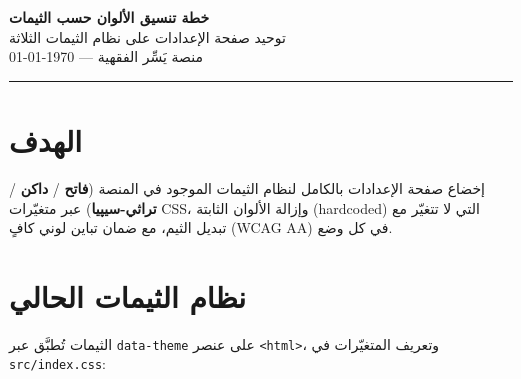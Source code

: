 \documentclass[11pt]{article}
\begin{document}
\begin{center}
  {\Huge\bfseries\color{gold} خطة تنسيق الألوان حسب الثيمات}\\[4pt]
  {\large\color{darkbg} توحيد صفحة الإعدادات على نظام الثيمات الثلاثة}\\[6pt]
  {\small\color{midgray} منصة يَسِّر الفقهية — \today}
\end{center}

\vspace{4pt}
\hrule
\vspace{10pt}

\section{الهدف}

\begin{goalbox}
إخضاع صفحة الإعدادات بالكامل لنظام الثيمات الموجود في المنصة
(\textbf{فاتح} / \textbf{داكن} / \textbf{تراثي-سيپيا}) عبر متغيّرات CSS، وإزالة الألوان الثابتة
(hardcoded) التي لا تتغيّر مع تبديل الثيم، مع ضمان تباين لوني كافٍ (WCAG AA) في كل وضع.
\end{goalbox}

\section{نظام الثيمات الحالي}

الثيمات تُطبَّق عبر \texttt{data-theme} على عنصر \texttt{<html>}، وتعريف المتغيّرات في
\texttt{src/index.css}:
\end{document}
